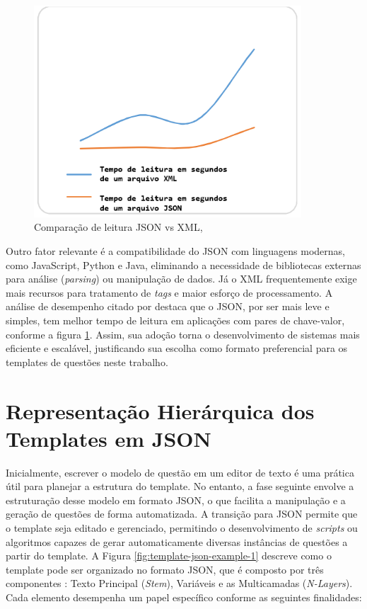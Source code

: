 \begin{figure}[ht]
	\centering
	\includegraphics[width=10cm]{./imagens/capitulo5/json-vs-xml}
	\caption{Comparação de leitura JSON vs XML, \parencite{goyal2017} }
	\label{fig:json-vs-xml}
\end{figure}

Outro fator relevante é a compatibilidade do JSON com linguagens modernas, como JavaScript, Python e Java, eliminando a necessidade de bibliotecas externas para análise (\textit{parsing}) ou manipulação de dados. Já o XML frequentemente exige mais recursos para tratamento de \textit{tags} e maior esforço de processamento. A análise de desempenho citado por \parencite{goyal2017} destaca que o JSON, por ser mais leve e simples, tem melhor tempo de leitura em aplicações com pares de chave-valor, conforme a figura \ref{fig:json-vs-xml}. Assim, sua adoção torna o desenvolvimento de sistemas mais eficiente e escalável, justificando sua escolha como formato preferencial para os templates de questões neste trabalho.


\section{Representação Hierárquica dos Templates em JSON}

Inicialmente, escrever o modelo de questão em um editor de texto é uma prática útil para planejar a estrutura do template. No entanto, a fase seguinte envolve a estruturação desse modelo em formato JSON, o que facilita a manipulação e a geração de questões de forma automatizada. A transição para JSON permite que o template seja editado e gerenciado, permitindo o desenvolvimento de \textit{scripts} ou algoritmos capazes de gerar automaticamente diversas instâncias de questões a partir do template.
A Figura \ref{fig:template-json-example-1} descreve como o template pode ser organizado no formato JSON, que é composto por três componentes : Texto Principal (\textit{Stem}), Variáveis e as Multicamadas (\textit{N-Layers}). Cada elemento desempenha um papel específico conforme as seguintes finalidades:


